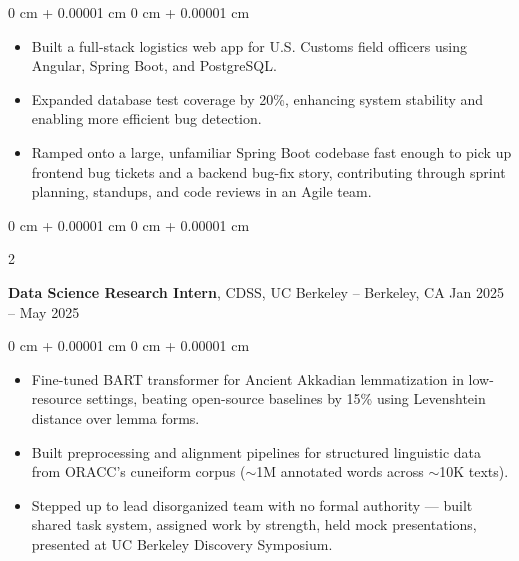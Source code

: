 \documentclass[10pt, letterpaper]{article}
\newenvironment{highlights}{
    \begin{itemize}[
        topsep=0.3 cm,
        parsep=0.05 cm,
        partopsep=0pt,
        itemsep=0.02 cm,
        leftmargin=0 cm + 10pt
    ]
}{
    \end{itemize}
} %
\newenvironment{onecolentry}{
    \begin{adjustwidth}{
        0 cm + 0.00001 cm
    }{
        0 cm + 0.00001 cm
    }
}{
    \end{adjustwidth}
} %
\newenvironment{twocolentry}[2][]{
    \onecolentry
    \def\secondColumn{#2}
    \setcolumnwidth{\fill, 4.5 cm}
    \begin{paracol}{2}
}{
    \switchcolumn \raggedleft \secondColumn
    \end{paracol}
    \endonecolentry
} %
\begin{document}
        \vspace{0.10 cm}
        \begin{onecolentry}
            \begin{highlights}
                \item Built a full-stack logistics web app for U.S. Customs field officers using Angular, Spring Boot, and PostgreSQL.
                \item Expanded database test coverage by 20\%, enhancing system stability and enabling more efficient bug detection.
                \item Ramped onto a large, unfamiliar Spring Boot codebase fast enough to pick up frontend bug tickets and a backend bug-fix story, contributing through sprint planning, standups, and code reviews in an Agile team.
            \end{highlights}
        \end{onecolentry}

        \vspace{0.10 cm}

        \begin{twocolentry}{
            Jan 2025 – May 2025
        }
            \textbf{Data Science Research Intern}, CDSS, UC Berkeley -- Berkeley, CA\end{twocolentry}

        \vspace{0.10 cm}
        \begin{onecolentry}
            \begin{highlights}
                \item Fine-tuned BART transformer for Ancient Akkadian lemmatization in low-resource settings, beating open-source baselines by 15\% using Levenshtein distance over lemma forms.
                \item Built preprocessing and alignment pipelines for structured linguistic data from ORACC's cuneiform corpus ($\sim$1M annotated words across $\sim$10K texts).
                \item Stepped up to lead disorganized team with no formal authority — built shared task system, assigned work by strength, held mock presentations, presented at UC Berkeley Discovery Symposium.
            \end{highlights}
       \end{onecolentry}
\end{document}
